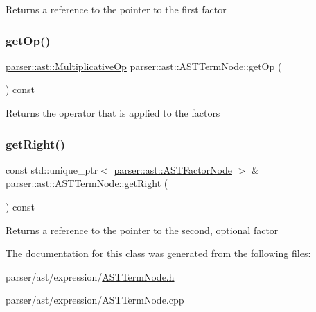 \begin{DoxyReturn}{Returns}
a reference to the pointer to the first factor 
\end{DoxyReturn}
\mbox{\label{classparser_1_1ast_1_1ASTTermNode_a8216196b573296bb0a0bee30a908a9af}} 
\subsubsection{\texorpdfstring{get\+Op()}{getOp()}}
{\footnotesize\ttfamily \hyperlink{ASTTermNode_8h_a56419c32f44e139982c327d8375a27a7}{parser\+::ast\+::\+Multiplicative\+Op} parser\+::ast\+::\+A\+S\+T\+Term\+Node\+::get\+Op (\begin{DoxyParamCaption}{ }\end{DoxyParamCaption}) const}

\begin{DoxyReturn}{Returns}
the operator that is applied to the factors 
\end{DoxyReturn}
\mbox{\label{classparser_1_1ast_1_1ASTTermNode_aa7e15b30a84f8afcd75f85c354103ca0}} 
\subsubsection{\texorpdfstring{get\+Right()}{getRight()}}
{\footnotesize\ttfamily const std\+::unique\+\_\+ptr$<$ \hyperlink{classparser_1_1ast_1_1ASTFactorNode}{parser\+::ast\+::\+A\+S\+T\+Factor\+Node} $>$ \& parser\+::ast\+::\+A\+S\+T\+Term\+Node\+::get\+Right (\begin{DoxyParamCaption}{ }\end{DoxyParamCaption}) const}

\begin{DoxyReturn}{Returns}
a reference to the pointer to the second, optional factor 
\end{DoxyReturn}


The documentation for this class was generated from the following files\+:\begin{DoxyCompactItemize}
\item 
parser/ast/expression/\hyperlink{ASTTermNode_8h}{A\+S\+T\+Term\+Node.\+h}\item 
parser/ast/expression/A\+S\+T\+Term\+Node.\+cpp\end{DoxyCompactItemize}
